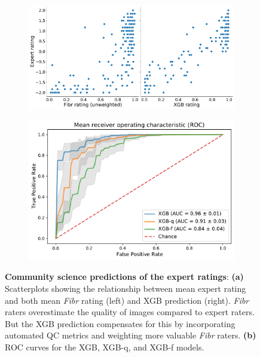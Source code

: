 \documentclass[fleqn,10pt]{wlscirep}
\begin{document}
\begin{figure}[tbp]
    \begin{subfigure}{.55\textwidth}
    \centering
    \includegraphics[width=\linewidth]{community-qc/fibr-rating-scatter-plot.pdf}
    \caption{}
    \label{fig:fibr-qc:scatter}
    \end{subfigure}
    \begin{subfigure}{.45\textwidth}
    \centering
    \includegraphics[width=\linewidth]{community-qc/xgb-roc-curve.pdf}
    \caption{}
    \label{fig:fibr-qc:roc}
    \end{subfigure}
    \caption{%
        {\bf Community science predictions of the expert ratings}:
        \textbf{(a)} Scatterplots showing the relationship between mean expert
        rating and both mean \emph{Fibr} rating (left) and XGB prediction
        (right). \emph{Fibr} raters overestimate the quality of images compared
        to expert raters. But the XGB prediction compensates for this by
        incorporating automated QC metrics and weighting more valuable
        \emph{Fibr} raters.
        \textbf{(b)} ROC curves for the XGB, XGB-q, and XGB-f models.
    }
    \label{fig:fibr-qc}
\end{figure}
\end{document}
